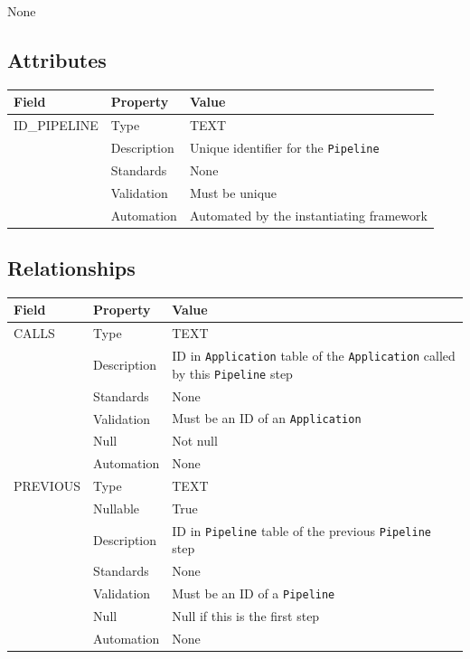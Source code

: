 \documentclass[
]{article}
\newcounter{none}
\begin{document}
None

\subsection{Attributes}\label{attributes-21}

{\def\LTcaptype{none} 
\begin{longtable}[]{@{}lll@{}}
\toprule\noalign{}
Field & Property & Value \\
\midrule\noalign{}
\endhead
\bottomrule\noalign{}
\endlastfoot
ID\_PIPELINE & Type & TEXT \\
& Description & Unique identifier for the \texttt{Pipeline} \\
& Standards & None \\
& Validation & Must be unique \\
& Automation & Automated by the instantiating framework \\
\end{longtable}
}

\subsection{Relationships}\label{relationships-19}

{\def\LTcaptype{none} 
\begin{longtable}[]{@{}
  >{\raggedright\arraybackslash}p{}
  >{\raggedright\arraybackslash}p{}
  >{\raggedright\arraybackslash}p{}@{}}
\toprule\noalign{}
\begin{minipage}[b]{\linewidth}\raggedright
Field
\end{minipage} & \begin{minipage}[b]{\linewidth}\raggedright
Property
\end{minipage} & \begin{minipage}[b]{\linewidth}\raggedright
Value
\end{minipage} \\
\midrule\noalign{}
\endhead
\bottomrule\noalign{}
\endlastfoot
CALLS & Type & TEXT \\
& Description & ID in \texttt{Application} table of the
\texttt{Application} called by this \texttt{Pipeline} step \\
& Standards & None \\
& Validation & Must be an ID of an \texttt{Application} \\
& Null & Not null \\
& Automation & None \\
PREVIOUS & Type & TEXT \\
& Nullable & True \\
& Description & ID in \texttt{Pipeline} table of the previous
\texttt{Pipeline} step \\
& Standards & None \\
& Validation & Must be an ID of a \texttt{Pipeline} \\
& Null & Null if this is the first step \\
& Automation & None \\
\end{longtable}
}
\end{document}
